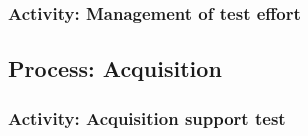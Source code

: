 \begin{comment}
			\begin{table}
			\caption{Example task description (for one task)}
			\label{tab:example-task-description}
			\centering
			\begin{tabular}{@{}lp{0.7\linewidth}lp{}}
			\toprule
			\emph{Task} & Generate system test design \\
			\midrule
			\emph{Methods} & Ensure that test design correctly emanates from the system test plan and conforms
			to IEEE Std 829-2008 regarding purpose, format, and content.\\
			\emph{Inputs} & System Test Plan, IEEE Std 829-2008 \\
			\emph{Outputs} & System Test Design, provide input to Master Test Report \\
			\emph{Schedule} & Initiate (with all inputs received) 30 days after the start of the project. Must be
			completed and approved 120 days after start of project. \\
			\emph{Resources} & Refer to MTP clause 1.5.4. \\
			\emph{Risk(s) and assumptions} & Risk: adequacy and timeliness of the test plans
			Assumption: Timeliness is a primary concern because the team writing the test
			cases is dependent on the receipt of this the test plans \\
			\emph{Roles and responsibilities} & Refer to MTP clause 1.5.5. \\
			\bottomrule
			\end{tabular}
			\end{table}
			$>$
		\end{comment}

	\subsubsection{Activity: Management of test effort} \label{s:details-of-the-master-test-plan:activity-management-of-test-effort}

	\subsection{Process: Acquisition} \label{s:details-of-the-master-test-plan:process-acquisiton}
	
		\subsubsection{Activity: Acquisition support test} \label{s:details-of-the-master-test-plan:activitiy-acquisition-support-test} 
		
